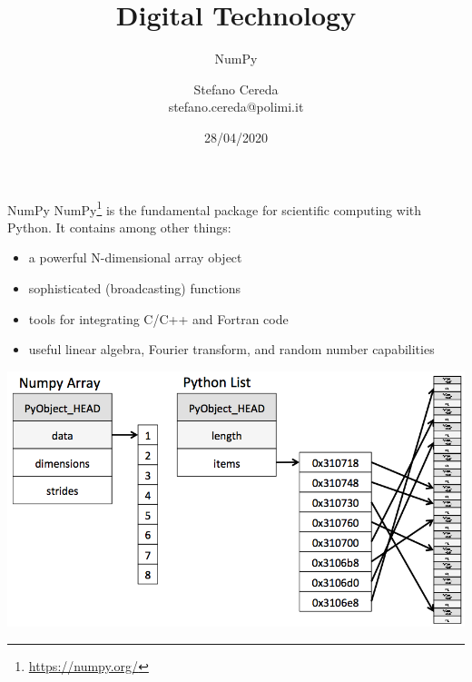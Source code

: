 \documentclass[aspectratio=169,]{beamer}
\title{Digital Technology}
\subtitle{NumPy}
\author{Stefano Cereda\\
stefano.cereda@polimi.it
}
\date{28/04/2020}
\institute[PoliMi]{Politecnico Milano}
\begin{document}
\begin{frame}
    \maketitle
\end{frame}

\begin{frame}[fragile]{NumPy}
    NumPy\footnote{\url{https://numpy.org/}} is the fundamental package for scientific computing with Python. It contains among other things:
    \begin{itemize}
        \item a powerful N-dimensional array object
        \item sophisticated (broadcasting) functions
        \item tools for integrating C/C++ and Fortran code
        \item useful linear algebra, Fourier transform, and random number capabilities
    \end{itemize}


    \centering
    \includegraphics[width=.4\textwidth]{./memory.png}
\end{frame}
\end{document}
